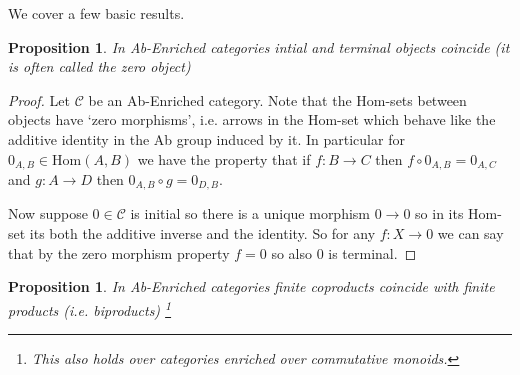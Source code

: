 \documentclass[12pt]{article}
\numberwithin{equation}{section}
\newcommand{\Hom}{{\mathrm{Hom}}}
\newcounter{dummy} \numberwithin{dummy}{section}
\newtheorem{proposition}[dummy]{Proposition}
\begin{document}
	We cover a few basic results.
	
	\begin{proposition}
		In Ab-Enriched categories intial and terminal objects coincide (it is often called the zero object)
	\end{proposition}
	\begin{proof}
		Let $\mathcal{C}$ be an Ab-Enriched category. Note that the Hom-sets between objects have `zero morphisms', i.e. arrows in the Hom-set which behave like the additive identity in the Ab group induced by it. In particular for $0_{A,B}\in \Hom(A,B)$ we have the property that if $f:B \to C$ then $f\circ 0_{A,B}=0_{A,C}$ and $g: A \to D$ then $0_{A,B}\circ g=0_{D,B}$.
		
		Now suppose $0 \in \mathcal{C}$ is initial so there is a unique morphism $0\to 0$ so in its Hom-set its both the additive inverse and the identity. So for any $f:X \to 0$ we can say that by the zero morphism property $f=0$ so also $0$ is terminal.
	\end{proof}
	\begin{proposition}
		In Ab-Enriched categories finite coproducts coincide with finite products (i.e. biproducts) \footnote{This also holds over categories enriched over commutative monoids.}
	\end{proposition}
\end{document}
